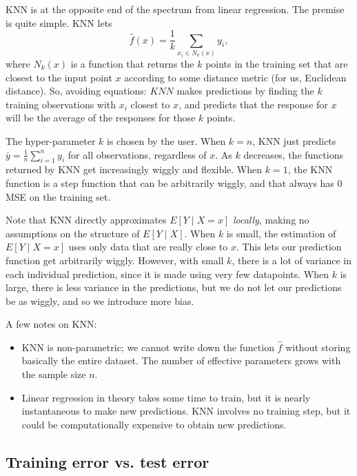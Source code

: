 {KNN is at the opposite end of the spectrum from linear regression. The premise is quite simple. KNN lets
\begin{equation}
\hat{f}(x) = \frac{1}{k} \sum_{x_i \in N_k(x)} y_i,
\end{equation}
where $N_k(x)$ is a function that returns the $k$ points in the training set that are closest to the input point $x$ according to some distance metric (for us, Euclidean distance). So, avoiding equations: $KNN$ makes predictions by finding the $k$ training observations with $x_i$ closest to $x$, and predicts that the response for $x$ will be the average of the responses for those $k$ points. 

The hyper-parameter $k$ is chosen by the user. When $k=n$, KNN just predicts $\bar{y} = \frac{1}{n} \sum_{i=1}^n y_i$ for all observations, regardless of $x$. As $k$ decreases, the functions returned by KNN get increasingly wiggly and flexible. When $k=1$, the KNN function is a step function that can be arbitrarily wiggly, and that always has $0$ MSE on the training set.  

Note that KNN directly approximates $E[Y \mid X=x]$ \emph{locally}, making no assumptions on the structure of $E[Y \mid X]$. When $k$ is small, the 
estimation of $E[Y \mid X=x]$  uses only data that are really close to $x$. This lets our prediction function get arbitrarily wiggly. However, with small $k$, there is a lot of variance in each individual prediction, since it is made using very few datapoints. When $k$ is large, there is less variance in the predictions, but we do not let our predictions be as wiggly, and so we introduce more bias. 

A few notes on KNN:
\begin{itemize}
\item KNN is non-parametric; we cannot write down the function $\hat{f}$ without storing basically the entire dataset. The number of effective parameters grows with the sample size $n$. 
\item Linear regression in theory takes some time to train, but it is nearly instantaneous to make new predictions. KNN involves no training step, but it could be computationally expensive to obtain new predictions. 
\end{itemize}

\subsection{Training error vs. test error}

}
